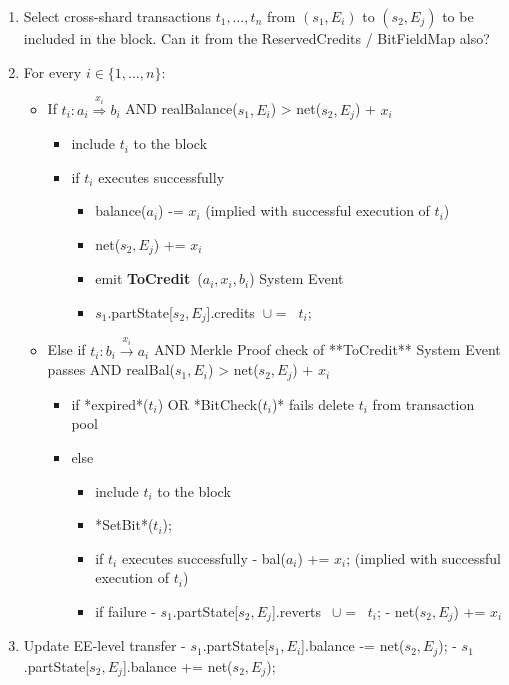\documentclass{article}
\newcommand{\tocredit}[0]{{\bf ToCredit}~}
\begin{document}
\begin{enumerate}
    \begin{enumerate}
	\item Select cross-shard transactions $t_1,\ldots,t_n$ from $(s_1,E_i)$ to $(s_2,E_j)$ to be included in the block. Can it from the ReservedCredits / BitFieldMap also?
	\item For every $i \in \{1, \ldots, n\}$: 
		\begin{itemize}
		\item If $t_i : a_i \stackrel{x_i}{\Longrightarrow} b_i$ AND realBalance($s_1,E_i$) > net($s_2,E_j$) + $x_i$
		\begin{itemize}
			\item include $t_i$ to the block
			\item if $t_i$ executes successfully 
			\begin{itemize}
				\item balance($a_i$) -= $x_i$ (implied with successful execution of $t_i$)
				\item net($s_2,E_j$) += $x_i$
				\item emit \tocredit($a_i, x_i, b_i$) System Event
				\item $s_1$.partState[$s_2,E_j$].credits $~ \cup= ~$ {$t_i$};
			\end{itemize}
		\end{itemize}
		\item Else if $t_i : b_i \stackrel{x_i}{\longrightarrow} a_i$ AND Merkle Proof check of **ToCredit** System Event passes AND realBal($s_1,E_i$) > net($s_2,E_j$) + $x_i$
		\begin{itemize}
			\item if *expired*($t_i$) OR *BitCheck($t_i$)* fails
				 delete $t_i$ from transaction pool
			\item else 
			\begin{itemize}
				\item include $t_i$ to the block
				\item *SetBit*($t_i$);
				\item if $t_i$ executes successfully
					- bal($a_i$) += $x_i$; (implied with successful execution of $t_i$)
				\item if failure 
					- $s_1$.partState[$s_2,E_j$].reverts $~~\cup=~$ {$t_i$};
					- net($s_2,E_j$) += $x_i$ 
			\end{itemize}
		\end{itemize}
	\end{itemize}
	\item Update EE-level transfer
		- $s_1$.partState[$s_1,E_i$].balance -= net($s_2,E_j$); 
		- $s_1$.partState[$s_2,E_j$].balance += net($s_2,E_j$);
    \end{enumerate}
\end{enumerate}
\end{document}
